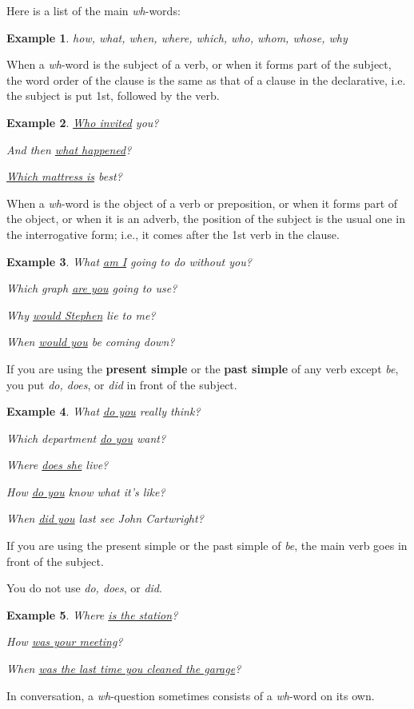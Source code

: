 \documentclass[oneside]{book}
\numberwithin{equation}{section}
\newtheorem{example}{Example}[section]
\begin{document}
Here is a list of the main \textit{wh}-words:
\begin{example}
    how, what, when, where, which, who, whom, whose, why
\end{example}
%
\noindent{} When a \textit{wh}-word is the subject of a verb, or when it forms part of the subject, the word order of the clause is the same as that of a clause in the declarative, i.e. the subject is put 1st, followed by the verb.
\begin{example}
    \underline{Who invited} you?
    
    And then \underline{what happened}?
    
    \underline{Which mattress is} best?
\end{example}
%
\noindent{} When a \textit{wh}-word is the object of a verb or preposition, or when it forms part of the object, or when it is an adverb, the position of the subject is the usual one in the interrogative form; i.e., it comes after the 1st verb in the clause.
\begin{example}
    What \underline{am I} going to do without you?
    
    Which graph \underline{are you} going to use?
    
    Why \underline{would Stephen} lie to me?
    
    When \underline{would you} be coming down?
\end{example}
If you are using the \textbf{present simple} or the \textbf{past simple} of any verb except \textit{be}, you put \textit{do, does}, or \textit{did} in front of the subject.
\begin{example}
    What \underline{do you} really think?
    
    Which department \underline{do you} want?
    
    Where \underline{does she} live?
    
    How \underline{do you} know what it's like?
    
    When \underline{did you} last see John Cartwright?
\end{example}
If you are using the present simple or the past simple of \textit{be}, the main verb goes in front of the subject.

You do not use \textit{do, does}, or \textit{did}.
\begin{example}
    Where \underline{is the station}?
    
    How \underline{was your meeting}?
    
    When \underline{was the last time you cleaned the garage}?
\end{example}
%
\noindent{} In conversation, a \textit{wh}-question sometimes consists of a \textit{wh}-word on its own.
\end{document}
